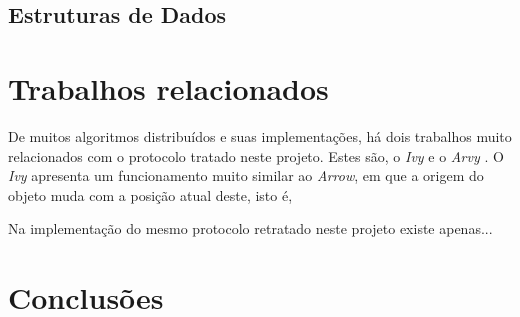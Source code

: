 \subsection{Estruturas de Dados}


\section{Trabalhos relacionados}
De muitos algoritmos distribuídos e suas implementações, há dois trabalhos muito relacionados com o protocolo tratado neste projeto. Estes são, o \emph{Ivy} \cite{Ivy} e o \emph{Arvy} \cite{Arvy}.
O \emph{Ivy} apresenta um funcionamento muito similar ao \emph{Arrow}, em que a origem do objeto muda com a posição atual deste, isto é, 


Na implementação do mesmo protocolo retratado neste projeto existe apenas...




\section{Conclusões}
\label{chap2:sec:concs}
